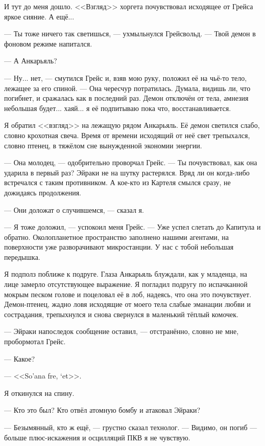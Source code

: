 И тут до меня дошло.
<<Взгляд>> хоргета почувствовал исходящее от Грейса яркое сияние.
А ещё...

--- Ты тоже ничего так светишься, --- ухмыльнулся Грейсвольд.
--- Твой демон в фоновом режиме напитался.

--- А Анкарьяль?

--- Ну... нет, --- смутился Грейс и, взяв мою руку, положил её на чьё-то тело, лежащее за его спиной.
--- Она чересчур потратилась.
Думала, видишь ли, что погибнет, и сражалась как в последний раз.
Демон отключён от тела, амнезия небольшая будет... хаяй... я её подпитываю пока что, восстанавливается.

Я обратил <<взгляд>> на лежащую рядом Анкарьяль.
Её демон светился слабо, словно крохотная свеча.
Время от времени исходящий от неё свет трепыхался, словно птенец, в тяжёлом сне вынужденной экономии энергии.

--- Она молодец, --- одобрительно проворчал Грейс.
--- Ты почувствовал, как она ударила в первый раз?
Эйраки не на шутку растерялся.
Вряд ли он когда-либо встречался с таким противником.
А кое-кто из Картеля смылся сразу, не дожидаясь продолжения.

--- Они доложат о случившемся, --- сказал я.

--- Я тоже доложил, --- успокоил меня Грейс.
--- Уже успел слетать до Капитула и обратно.
Околопланетное пространство заполнено нашими агентами, на поверхности уже разворачивают микростанции.
У нас с тобой небольшая передышка.

Я подполз поближе к подруге.
Глаза Анкарьяль блуждали, как у младенца, на лице замерло отсутствующее выражение.
Я погладил подругу по испачканной мокрым песком голове и поцеловал её в лоб, надеясь, что она это почувствует.
Демон-птенец, жадно ловя исходящие от моего тела слабые эманации любви и сострадания, трепыхнулся и снова свернулся в маленький тёплый комочек.

--- Эйраки напоследок сообщение оставил, --- отстранённо, словно не мне, пробормотал Грейс.

--- Какое?

--- <<So’ana fre, ‘et>>\FM.

Я откинулся на спину.

--- Кто это был?
Кто отвёл атомную бомбу и атаковал Эйраки?

--- Безымянный, кто ж ещё, --- грустно сказал технолог.
--- Видимо, он погиб --- больше плюс-искажения и осцилляций ПКВ я не чувствую.

